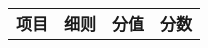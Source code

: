 \documentclass{article}
\begin{document}
\begin{table}
\begin{tabular}{llll}
\textbf{项目}&\textbf{细则}&\textbf{分值}&\textbf{分数}\\
\end{tabular}
\end{table}
\end{document}
